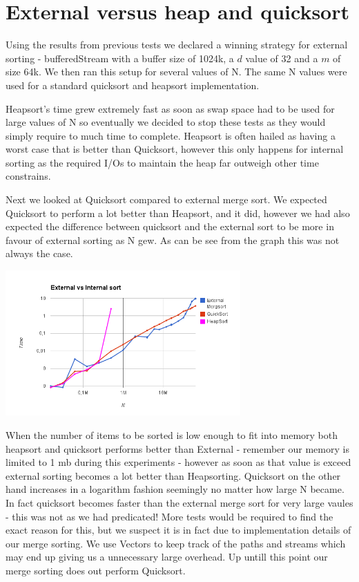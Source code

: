 \section{External versus heap and quicksort}

Using the results from previous tests we declared a winning strategy for external sorting - bufferedStream with a buffer size of 1024k, a $d$ value of 32 and a $m$ of size 64k. We then ran this setup for several values of N. The same N values were used for a standard quicksort and heapsort implementation.

Heapsort's time grew extremely fast as soon as swap space had to be used for large values of N so eventually we decided to stop these tests as they would simply require to much time to complete. Heapsort is often hailed as having a worst case that is better than Quicksort, however this only happens for internal sorting as the required I/Os to maintain the heap far outweigh other time constrains.

Next we looked at Quicksort compared to external merge sort. We expected Quicksort to perform a lot better than Heapsort, and it did, however we had also expected the difference between quicksort and the external sort to be more in favour of external sorting as N gew. As can be see from the graph this was not always the case.

\includegraphics[width=90mm]{graphics/compare.png}

When the number of items to be sorted is low enough to fit into memory both heapsort and quicksort performs better than External - remember our memory is limited to 1 mb during this experiments - however as soon as that value is exceed external sorting becomes a lot better than Heapsorting. Quicksort on the other hand increases in a logarithm fashion seemingly no matter how large N became. In fact quicksort becomes faster than the external merge sort for very large vaules - this was not as we had predicated! More tests would be required to find the exact reason for this, but we suspect it is in fact due to implementation details of our merge sorting. We use Vectors to keep track of the paths and streams which may end up giving us a unnecessary large overhead. Up untill this point our merge sorting does out perform Quicksort.
